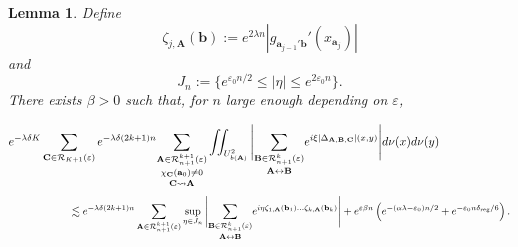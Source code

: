 \documentclass[a4paper]{article}
\newtheorem{lemma}[theorem]{Lemma}
\theoremstyle{definition}
\begin{document}
\begin{lemma}\label{lem:reduc2}
Define $$\zeta_{j,\mathbf{A}}(\mathbf{b}) := e^{2 \lambda n} |g_{\mathbf{a}_{j-1}' \mathbf{b}}'(x_{\mathbf{\mathbf{a}}_j})|$$
and $$ J_n := \{ e^{\varepsilon_0 n/2} \leq |\eta| \leq e^{2 \varepsilon_0 n}  \} .$$
There exists $\beta > 0$ such that, for $n$ large enough depending on $\varepsilon$,

$$  e^{- \lambda \delta K} \sum_{\mathbf{C} \in \mathcal{R}_{K+1}(\varepsilon)} e^{-\lambda \delta (2k+1) n}   \underset{\mathbf{C} \rightsquigarrow \mathbf{A}}{\underset{\chi_\mathbf{C}(\mathbf{a}_0) \neq 0}{\underset{\mathbf{A} \in \mathcal{R}_{n+1}^{k+1}(\varepsilon)}{\sum}}} \iint_{U_{b(\mathbf{A})}^2 }  \Bigg{|} \underset{\mathbf{A} \leftrightarrow \mathbf{B}}{\sum_{\mathbf{B} \in \mathcal{R}_{n+1}^k(\varepsilon)}} e^{i \xi \left|\Delta_{\mathbf{A},\mathbf{B},\mathbf{C}}\right|(x,y) } \Bigg| d\nu(x) d\nu(y)  \quad \quad \quad \quad \quad \quad   $$
$$ \quad \quad \quad \quad \quad \quad \lesssim  e^{-\lambda \delta (2k+1) n} \sum_{\mathbf{A} \in \mathcal{R}_{n+1}^{k+1}(\varepsilon)} \sup_{\eta \in J_n} \Bigg{|} \underset{\mathbf{A} \leftrightarrow \mathbf{B}}{\sum_{\mathbf{B} \in \mathcal{R}_{n+1}^k(\varepsilon)}} e^{i \eta \zeta_{1,\mathbf{A}}(\mathbf{b}_1) \dots \zeta_{k,\mathbf{A}}(\mathbf{b}_k) } \Bigg|  + e^{ \varepsilon \beta n} \left( e^{-  (\alpha \lambda - \varepsilon_0) n/2}  + e^{- \varepsilon_0 n \delta_{\text{reg}}/6} \right) .$$


\end{lemma}
\end{document}
